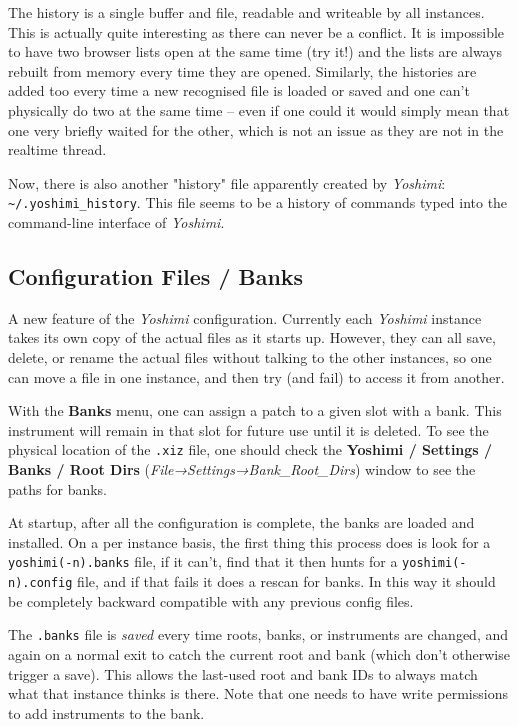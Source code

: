    The history is a single buffer and file, readable and writeable by all
   instances. This is actually quite interesting as there can never be a
   conflict.  It is impossible to have two browser lists open at the same time
   (try it!) and the lists are always rebuilt from memory every time they are
   opened. Similarly, the histories are added too every time a new recognised
   file is loaded or saved and one can't physically do two at the same time --
   even if one could it would simply mean that one very briefly waited for the
   other, which is not an issue as they are not in the realtime thread.

   Now, there is also another "history" file apparently created by
   \textsl{Yoshimi}: \texttt{\textasciitilde/.yoshimi\_history}.
   This file seems to be a history of commands typed into the command-line
   interface of \textsl{Yoshimi}.

\subsection{Configuration Files / Banks}
\label{subsec:configuration_banks}

   A new feature of the \textsl{Yoshimi} configuration.  Currently each
   \textsl{Yoshimi} instance takes its own copy of the actual files as it starts
   up.  However, they can all save, delete, or rename the actual files without
   talking to the other instances, so one can move a file in one instance, and
   then try (and fail) to access it from another.

   With the \textbf{Banks} menu, one can assign a patch to a given slot with
   a bank.  This instrument will remain in that slot for future use until it is
   deleted. To see the physical location of the \texttt{.xiz} file, one
   should check the
   \textbf{Yoshimi / Settings / Banks / Root Dirs}
   (\textsl{File→Settings→Bank\_Root\_Dirs}) window to see the paths for
   banks.

   At startup, after all the configuration is complete, the banks are loaded and
   installed.  On a per instance basis, the first thing this process does is
   look for a \texttt{yoshimi(-n).banks} file, if it can't, find that it then
   hunts for a \texttt{yoshimi(-n).config} file, and if that fails it does a
   rescan for banks. In this way it should be completely backward compatible
   with any previous config files.

   The \texttt{.banks} file is \textsl{saved} every time roots, banks, or
   instruments are changed, and again on a normal exit to catch the current
   root and bank (which don't otherwise trigger a save).  This allows the
   last-used root and bank IDs to always match what that instance thinks is
   there.
   Note that one needs to have write permissions to add instruments to the
   bank.
   
